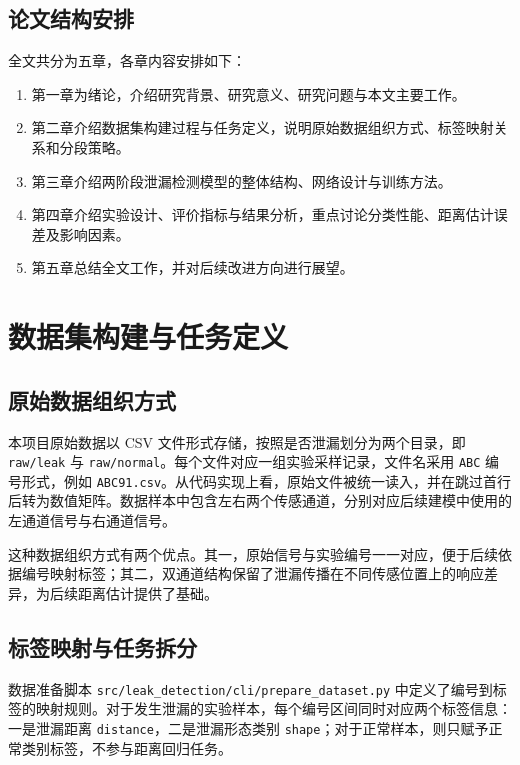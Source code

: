 \section{论文结构安排}

全文共分为五章，各章内容安排如下：

\begin{enumerate}
  \item 第一章为绪论，介绍研究背景、研究意义、研究问题与本文主要工作。
  \item 第二章介绍数据集构建过程与任务定义，说明原始数据组织方式、标签映射关系和分段策略。
  \item 第三章介绍两阶段泄漏检测模型的整体结构、网络设计与训练方法。
  \item 第四章介绍实验设计、评价指标与结果分析，重点讨论分类性能、距离估计误差及影响因素。
  \item 第五章总结全文工作，并对后续改进方向进行展望。
\end{enumerate}

\chapter{数据集构建与任务定义}

\section{原始数据组织方式}

本项目原始数据以 CSV 文件形式存储，按照是否泄漏划分为两个目录，即 \texttt{raw/leak} 与 \texttt{raw/normal}。每个文件对应一组实验采样记录，文件名采用 \texttt{ABC} 编号形式，例如 \texttt{ABC91.csv}。从代码实现上看，原始文件被统一读入，并在跳过首行后转为数值矩阵。数据样本中包含左右两个传感通道，分别对应后续建模中使用的左通道信号与右通道信号。

这种数据组织方式有两个优点。其一，原始信号与实验编号一一对应，便于后续依据编号映射标签；其二，双通道结构保留了泄漏传播在不同传感位置上的响应差异，为后续距离估计提供了基础。

\section{标签映射与任务拆分}

数据准备脚本 \texttt{src/leak\_detection/cli/prepare\_dataset.py} 中定义了编号到标签的映射规则。对于发生泄漏的实验样本，每个编号区间同时对应两个标签信息：一是泄漏距离 \texttt{distance}，二是泄漏形态类别 \texttt{shape}；对于正常样本，则只赋予正常类别标签，不参与距离回归任务。

